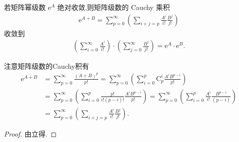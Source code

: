 \documentclass[../../main.tex]{subfiles}%
\begin{document}
\begin{corollary}\label{corollary:矩阵幂级数的绝对收敛性保证了Cauchy乘积的收敛性}
若矩阵幂级数 $\mathrm{e}^A$ 绝对收敛,则矩阵级数的 Cauchy 乘积
\begin{align*}
\mathrm{e}^{A + B}=\sum_{p = 0}^{\infty}\left(\sum_{i + j = p}\frac{A^i}{i!}\frac{B^j}{j!}\right)
\end{align*}
收敛到
\begin{align*}
\left(\sum_{i = 0}^{\infty}\frac{A^i}{i!}\right)\cdot\left(\sum_{j = 0}^{\infty}\frac{B^j}{j!}\right)=\mathrm{e}^A\cdot\mathrm{e}^B.
\end{align*}
\end{corollary}
\begin{remark}
注意矩阵级数的Cauchy积有
\begin{align*}
\mathrm{e}^{A+B}&=\sum_{p=0}^{\infty}{\frac{\left( A+B \right) ^p}{p!}}=\sum_{p=0}^{\infty}{\left( \sum_{i=0}^p{\mathrm{C}_{p}^{i}\frac{A^iB^{p-i}}{p!}} \right)}
\\
&=\sum_{p=0}^{\infty}{\left( \sum_{i=0}^p{\frac{p!}{i!\left( p-i \right) !}\frac{A^iB^{p-i}}{p!}} \right)}=\sum_{p=0}^{\infty}{\left( \sum_{i=0}^p{\frac{A^i}{i!}\frac{B^{p-i}}{\left( p-i \right)}} \right)}
\\
&=\sum_{p=0}^{\infty}{\left( \sum_{i+j=p}{\frac{A^i}{i!}\frac{B^j}{j!}} \right)}.
\end{align*}
\end{remark}
\begin{proof}
由立得.
\end{proof}
\end{document}
